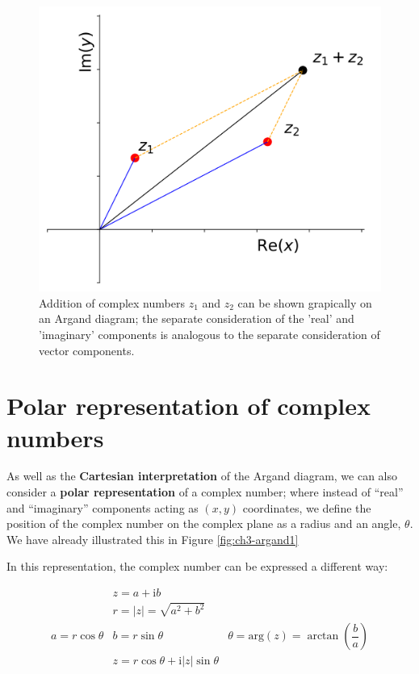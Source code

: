 \documentclass[
]{book}
\begin{document}
\begin{figure}

{\centering \includegraphics[width=0.7\linewidth]{visualisations/ch3-complexnumbers2} 

}

\caption{Addition of complex numbers $z_1$ and $z_2$ can be shown grapically on an Argand diagram; the separate consideration of the 'real' and 'imaginary' components is analogous to the separate consideration of vector components.}\label{fig:ch3-argandcomplexaddition1}
\end{figure}

\hypertarget{sec:ch3-polarcomplexnumbers}{%
\section{Polar representation of complex numbers}\label{sec:ch3-polarcomplexnumbers}}

As well as the \textbf{Cartesian interpretation} of the Argand diagram, we can also consider a \textbf{polar representation} of a complex number; where instead of ``real'' and ``imaginary'' components acting as \((x,y)\) coordinates, we define the position of the complex number on the complex plane as a radius and an angle, \(\theta\). We have already illustrated this in Figure \ref{fig:ch3-argand1}

In this representation, the complex number can be expressed a different way:

\begin{equation}
\begin{array}{rcl}
& z = a + \mathrm{i}b & \\
& r = |z| = \sqrt{a^2 + b^2} & \\
a = r\cos \theta & b = r \sin \theta & \theta = \mathrm{arg} (z) = \arctan \left( \dfrac{b}{a} \right) \\
& z = r \cos \theta + \mathrm{i}|z| \sin \theta &
\end{array}
\end{equation}
\end{document}
